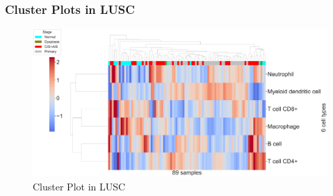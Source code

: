 \documentclass{beamer}
\begin{document}
    \begin{frame}
        \frametitle{Cluster Plots in LUSC}

        \begin{figure}
            \includegraphics[width=0.9 \linewidth]{figures/TIMER/Clustermap/STAR.FPKM.SQC/TIMER-All.pdf}
            \caption{Cluster Plot in LUSC}
        \end{figure}
    \end{frame}
\end{document}
